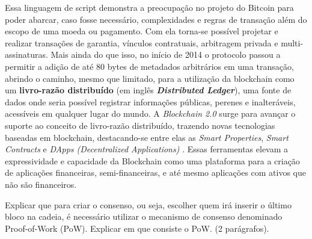 \documentclass[a4paper,11pt]{article}
\begin{document}
Essa linguagem de script demonstra a preocupação no projeto do Bitcoin para poder abarcar, caso fosse necessário, complexidades e regras de transação além do escopo de uma moeda ou pagamento.
Com ela torna-se possível projetar e realizar transações de garantia, vínculos contratuais, arbitragem privada e multi-assinaturas.
Mais ainda do que isso, no início de 2014 \cite{Greenspan2015} o protocolo passou a permitir a adição de até 80 bytes de metadados arbitrários em uma transação, abrindo o caminho, mesmo que limitado, para a utilização da blockchain como um \textbf{livro-razão distribuído} (em inglês \textbf{\textit{Distributed Ledger}}), uma fonte de dados onde seria possível registrar informações públicas, perenes e inalteráveis, acessíveis em qualquer lugar do mundo.
A \emph{Blockchain 2.0} surge para avançar o suporte ao conceito de livro-razão distribuído, trazendo novas tecnologias baseadas em blockchain, destacando-se entre elas as \emph{Smart Properties}, \emph{Smart Contracts} e \emph{DApps (Decentralized Applications)} \cite{Swan2015}.
Essas ferramentas elevam a expressividade e capacidade da Blockchain como uma plataforma para a criação de aplicações financeiras, semi-financeiras, e até mesmo aplicações com ativos que não são financeiros.



{\color{ForestGreen}Explicar que para criar o consenso, ou seja, escolher quem irá inserir o último bloco na cadeia, é necessário utilizar o mecanismo de consenso denominado Proof-of-Work (PoW). Explicar em que consiste o PoW. (2 parágrafos).}
\end{document}
